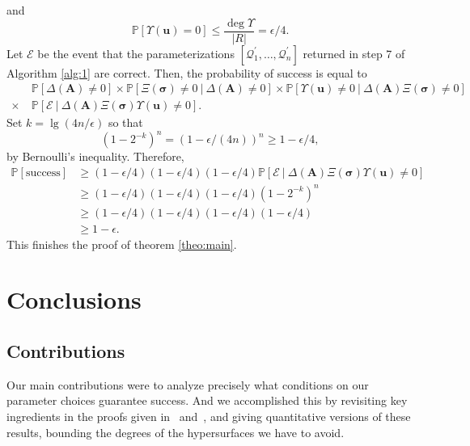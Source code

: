 \documentclass[12pt]{article}
\def\mA{{\bm A}}
\def\ub{{\bm u}}
\def\pr{\mathbb{P}}
\begin{document}
and
\[
\pr[\Upsilon(\ub)=0] \leq  \frac{\deg\Upsilon}{|R|} = \epsilon/4.
\]
Let $\mathscr{E}$ be the event that the parameterizations
$[\mathscr{Q}_1^{'},\hdots,\mathscr{Q}_{n}^{'}]$ returned in step 7 of
Algorithm \ref{alg:1} are correct. Then, the probability of success is equal to
\begin{align*}
 &\pr[\Delta(\mA)\ne 0] \times \pr[\Xi(\bm \sigma)\ne 0 ~|~\Delta(\mA) \ne 0] \times \pr[\Upsilon(\ub)\ne 0 ~|~\Delta(\mA)\Xi(\bm \sigma) \ne 0]\\ \times ~& \pr[\mathscr{E}~|~
   \Delta(\mA)\Xi(\bm \sigma)\Upsilon(\ub) \ne 0].
\end{align*}
Set $k = \lg(4n/\epsilon)$ so that 
\[
(1-2^{-k})^n = (1 - \epsilon/(4n))^n \geq 1 - \epsilon/4,
\]
by Bernoulli's inequality. Therefore, 
\begin{align*}
\pr[\textrm{success}] &\geq (1- \epsilon/4)(1- \epsilon/4)(1-
\epsilon/4) \pr[\mathscr{E}~|~
   \Delta(\mA)\Xi(\bm \sigma)\Upsilon(\ub) \ne 0]\\ 
& \geq (1- \epsilon/4)(1- \epsilon/4)(1-
\epsilon/4)(1-2^{-k})^n \\ & \geq (1- \epsilon/4)(1- \epsilon/4)(1- \epsilon/4)(1-
\epsilon/4)\\ & \geq 1 - \epsilon.
\end{align*}
This finishes the proof of theorem \ref{theo:main}.
%



\section{Conclusions}\label{chap:conclusions}

\subsection{Contributions}
Our main contributions were to analyze precisely what conditions on our
parameter choices guarantee success. And we accomplished this by
revisiting key ingredients in the proofs given
in~\cite{BaGiHeMb97} and~\cite{EMP}, and giving quantitative versions
of these results, bounding the degrees of the hypersurfaces we have to
avoid.  
\end{document}
